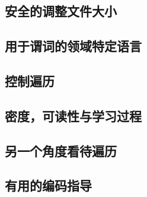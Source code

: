 \documentclass[./main.tex]{subfiles}
\begin{document}


\subsection*{安全的调整文件大小}

\subsection*{用于谓词的领域特定语言}

\subsection*{控制遍历}

\subsection*{密度，可读性与学习过程}

\subsection*{另一个角度看待遍历}

\subsection*{有用的编码指导}
\end{document}
